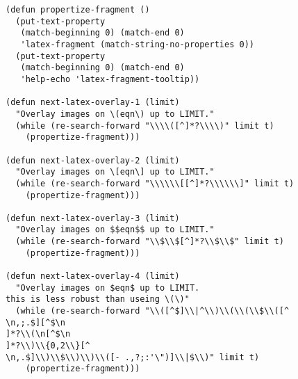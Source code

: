 \documentclass[11pt]{article}
\begin{document}
\begin{verbatim}
(defun propertize-fragment ()
  (put-text-property
   (match-beginning 0) (match-end 0)
   'latex-fragment (match-string-no-properties 0))
  (put-text-property
   (match-beginning 0) (match-end 0)
   'help-echo 'latex-fragment-tooltip))

(defun next-latex-overlay-1 (limit)
  "Overlay images on \(eqn\) up to LIMIT."
  (while (re-search-forward "\\\\([^ ]*?\\\\)" limit t)
    (propertize-fragment)))

(defun next-latex-overlay-2 (limit)
  "Overlay images on \[eqn\] up to LIMIT."
  (while (re-search-forward "\\\\\\[[^ ]*?\\\\\\]" limit t)
    (propertize-fragment)))

(defun next-latex-overlay-3 (limit)
  "Overlay images on $$eqn$$ up to LIMIT."
  (while (re-search-forward "\\$\\$[^ ]*?\\$\\$" limit t)
    (propertize-fragment)))

(defun next-latex-overlay-4 (limit)
  "Overlay images on $eqn$ up to LIMIT.
this is less robust than useing \(\)"
  (while (re-search-forward "\\([^$]\\|^\\)\\(\\(\\$\\([^	
\n,;.$][^$\n
]*?\\(\n[^$\n
]*?\\)\\{0,2\\}[^	
\n,.$]\\)\\$\\)\\)\\([-	.,?;:'\") ]\\|$\\)" limit t)
    (propertize-fragment)))


\end{verbatim}
\end{document}
